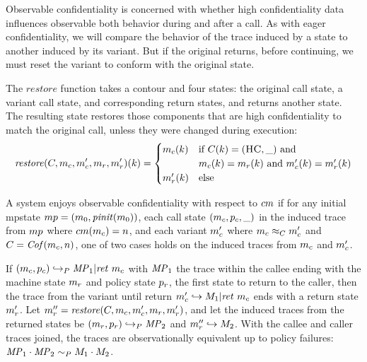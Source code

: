 \documentclass[acmsmall,review,anonymous]{acmart}\settopmatter{printfolios=true,printccs=false,printacmref=false}
\begin{document}

      Observable confidentiality is concerned with whether high confidentiality
      data influences observable both behavior during and after a call. As with
      eager confidentiality, we will compare the behavior of the trace induced
      by a state to another induced by its variant. But if the original returns,
      before continuing, we must reset the variant to conform with the original
      state.

      The \(\mathit{restore}\) function takes a contour and four states: the
      original call state, a variant call state, and corresponding return
      states, and returns another state. The resulting state restores those
      components that are high confidentiality to match the original call,
      unless they were changed during execution:
      \[\mathit{restore}(C,m_c,m_c',m_r,m_r')(k) =
        \begin{cases}
          m_c(k) & \text{if } C(k) = (\textsc{HC},\_) \text{ and } \\
                  & m_c(k) = m_r(k) \text{ and }
                    m_c'(k) = m_r'(k) \\
          m_r'(k) & \text{else} \\
        \end{cases}\]

      A system enjoys observable confidentiality with respect to \(cm\)
      if for any initial mpstate \(mp =
      (m_0,\mathit{pinit}(m_0))\), each call state
      \((m_c,p_c,\_)\) in the induced trace from
      \(mp\) where \(cm(m_c) = n\), and each variant
      \(m_c'\) where \(m_c \approx_C m_c'\) and
      \(C = \mathit{Cof}(m_c, n)\), one of two cases holds on the
      induced traces from \(m_c\) and \(m_c'\).

      If \((m_c,p_c) \hookrightarrow_P \mathit{MP}_1 | \mathit{ret}\ m_c\)
      with \(\mathit{MP}_1\) the trace within the callee ending with the machine state
      \(m_r\) and policy state \(p_r\), the first state to return to the
      caller, then the trace from the variant until return 
      \(m_c' \hookrightarrow M_1 | \mathit{ret}\ m_c\) ends with a return
      state \(m_r'\). Let \(m_r'' = \mathit{restore}(C,m_c,
      m_c',m_r,m_r')\), and let the induced traces from the
      returned states be \((m_r,p_r) \hookrightarrow_P \mathit{MP}_2\)
      and \(m_r'' \hookrightarrow M_2\). With the callee and caller
      traces joined, the traces are observationally equivalent up to policy
      failures: \(\mathit{MP}_1 \cdot \mathit{MP}_2 \sim_P M_1 \cdot M_2\).
\end{document}
